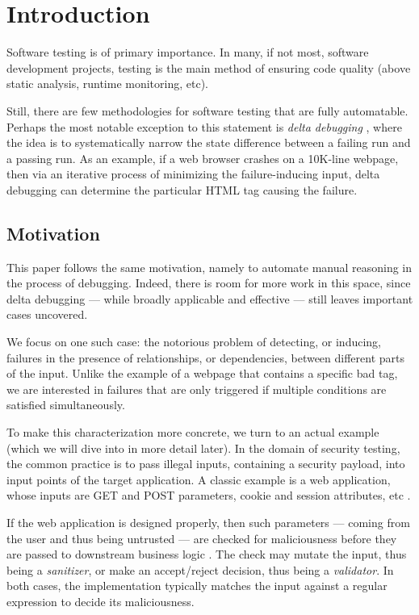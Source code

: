 \section{Introduction}

Software testing is of primary importance. In many, if not most, software development projects, testing is the main method of ensuring code quality (above static analysis, runtime monitoring, etc).

Still, there are few methodologies for software testing that are fully automatable. Perhaps the most notable exception to this statement is \emph{delta debugging} \cite{DeltaDebugging:2000,DeltaDebugging:2002}, where the idea is to systematically narrow the state difference between a failing run and a passing run. As an example, if a 
web browser crashes on a 10K-line webpage, then via an iterative process of minimizing the failure-inducing input, delta debugging can determine the particular HTML tag causing the failure.

\subsection{Motivation} This paper follows the same motivation, namely to automate manual reasoning in the process of debugging. Indeed, there is room for more work in this space, since delta debugging --- while broadly applicable and effective --- still leaves important cases uncovered.

We focus on one such case: the notorious problem of detecting, or inducing, failures in the presence of relationships, or dependencies, between different parts of the input. Unlike the example of a webpage that contains a specific bad tag, we are interested in failures that are only triggered if multiple conditions are satisfied simultaneously.

To make this characterization more concrete, we turn to an actual example (which we will dive into in more detail later). In the domain of security testing, the common practice is to pass illegal inputs, containing a security payload, into input points of the target application. A classic example is a web application, whose inputs are GET and POST parameters, cookie and session attributes, etc \cite{TrippIssta:2013}.

If the web application is designed properly, then such parameters --- coming from the user and thus being untrusted --- are checked for maliciousness before they are passed to downstream business logic \cite{Offutt1,Offutt2,Offutt3}. The check may mutate the input, thus being a \emph{sanitizer}, or make an accept/reject decision, thus being a \emph{validator}. In both cases, the implementation typically matches the input against a regular expression to decide its maliciousness.

